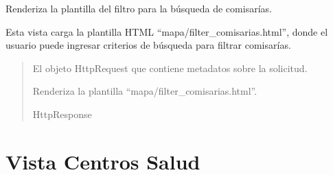 \documentclass[letterpaper,10pt,spanish]{sphinxmanual}
\begin{document}
\begin{fulllineitems}

\pysigstartsignatures
{}
\pysigstopsignatures
\sphinxAtStartPar
Renderiza la plantilla del filtro para la búsqueda de comisarías.

\sphinxAtStartPar
Esta vista carga la plantilla HTML “mapa/filter\_comisarias.html”, donde el usuario
puede ingresar criterios de búsqueda para filtrar comisarías.
\begin{quote}\begin{description}
\sphinxAtStartPar
{} \textendash{} El objeto HttpRequest que contiene metadatos sobre la solicitud.

\sphinxAtStartPar
Renderiza la plantilla “mapa/filter\_comisarias.html”.

\sphinxAtStartPar
HttpResponse

\end{description}\end{quote}

\end{fulllineitems}



\section{Vista Centros Salud}
\label{\detokenize{mapas:vista-centros-salud}}
\end{document}
